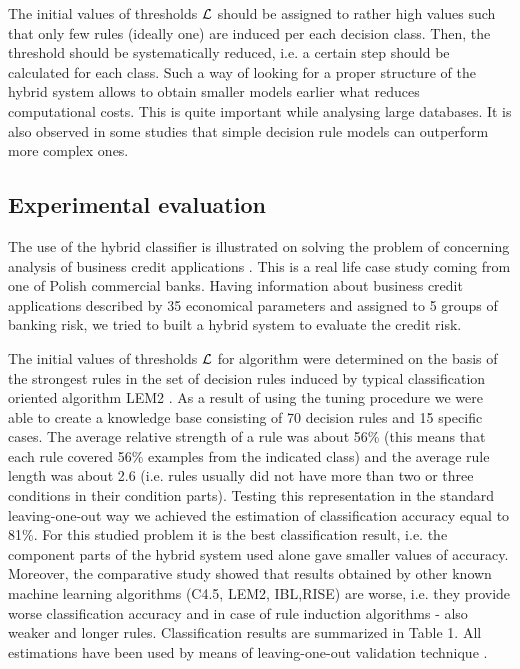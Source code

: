 \documentclass{article}
\begin{document}
The initial values of thresholds ${\cal L}$ should be assigned to
rather high values such that only few rules (ideally one) are
induced per each decision class. Then, the threshold should be
systematically reduced, i.e. a certain step should be calculated
for each class. Such a way of looking for a proper structure of
the hybrid system allows to obtain smaller models earlier what
reduces computational costs. This is quite important while
analysing large databases. It is also observed in some studies
that simple decision rule models can outperform more complex ones.

\subsection{Experimental evaluation}

The use of the hybrid classifier is illustrated on solving the
problem of concerning analysis of business credit applications
\cite{Wilk}. This is a real life case study coming from one of
Polish commercial banks. Having information about business credit
applications described by 35 economical parameters and assigned to
5 groups of banking risk, we tried to built a hybrid system to
evaluate the credit risk.

The initial values of thresholds {$\cal L$} for algorithm were
determined on the basis of the strongest rules in the set of
decision rules induced by typical classification oriented
algorithm LEM2 \cite{lers}. As a result of using the tuning
procedure we were able to create a knowledge base consisting of 70
decision rules and 15 specific cases. The average relative
strength of a rule was about 56\% (this means that each rule
covered 56\% examples from the indicated class) and the average
rule length was about 2.6 (i.e. rules usually did not have more
than two or three conditions in their condition parts). Testing
this representation in the standard leaving-one-out way we
achieved the estimation of classification accuracy equal to 81\%.
For this studied problem it is the best classification result,
i.e. the component parts of the hybrid system used alone gave
smaller values of accuracy. Moreover, the comparative study showed
that results obtained by other known machine learning algorithms
(C4.5, LEM2, IBL,RISE) are worse, i.e. they provide worse
classification accuracy and in case of rule induction algorithms -
also weaker and longer rules. Classification results are
summarized in Table 1. All estimations have been used by means of
leaving-one-out validation technique \cite{Weiss91}.
\end{document}
